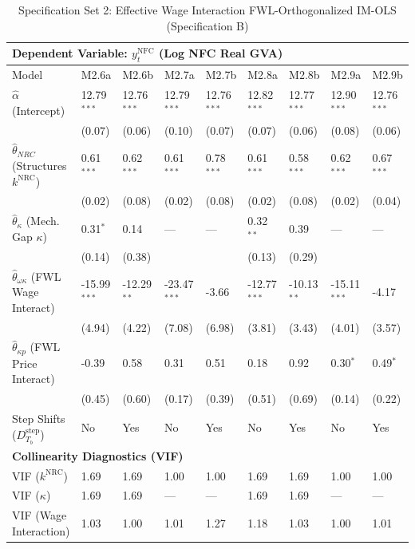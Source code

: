 \begin{table}[H]
\centering
\setlength{\tabcolsep}{2.5pt}
\caption{Specification Set 2: Effective Wage Interaction FWL-Orthogonalized IM-OLS (Specification B)}
\label{tab:specB_set2}
\scriptsize
\begin{tabular}{p{3.8cm}p{1.1cm}p{1.1cm}p{1.1cm}p{1.1cm}p{1.1cm}p{1.1cm}p{1.1cm}p{1.1cm}}
\toprule
\multicolumn{9}{l}{\textbf{Dependent Variable: $y_t^{\text{NFC}}$ (Log NFC Real GVA)}} \\
\midrule
Model & M2.6a & M2.6b & M2.7a & M2.7b & M2.8a & M2.8b & M2.9a & M2.9b \\
\midrule
$\hat{\alpha}$ (Intercept) & 12.79$^{***}$ & 12.76$^{***}$ & 12.79$^{***}$ & 12.76$^{***}$ & 12.82$^{***}$ & 12.77$^{***}$ & 12.90$^{***}$ & 12.76$^{***}$ \\
 & (0.07) & (0.06) & (0.10) & (0.07) & (0.07) & (0.06) & (0.08) & (0.06) \\
$\hat{\theta}_{NRC}$ (Structures $k^{\text{NRC}}$) & 0.61$^{***}$ & 0.62$^{***}$ & 0.61$^{***}$ & 0.78$^{***}$ & 0.61$^{***}$ & 0.58$^{***}$ & 0.62$^{***}$ & 0.67$^{***}$ \\
 & (0.02) & (0.08) & (0.02) & (0.08) & (0.02) & (0.08) & (0.02) & (0.04) \\
$\hat{\theta}_{\kappa}$ (Mech. Gap $\kappa$) & 0.31$^{*}$ & 0.14 & --- & --- & 0.32$^{**}$ & 0.39 & --- & --- \\
 & (0.14) & (0.38) &  &  & (0.13) & (0.29) &  &  \\
$\hat{\theta}_{\omega\kappa}$ (FWL Wage Interact) & -15.99$^{***}$ & -12.29$^{**}$ & -23.47$^{***}$ & -3.66 & -12.77$^{***}$ & -10.13$^{**}$ & -15.11$^{***}$ & -4.17 \\
 & (4.94) & (4.22) & (7.08) & (6.98) & (3.81) & (3.43) & (4.01) & (3.57) \\
$\hat{\theta}_{\kappa p}$ (FWL Price Interact) & -0.39 & 0.58 & 0.31 & 0.51 & 0.18 & 0.92 & 0.30$^{*}$ & 0.49$^{*}$ \\
 & (0.45) & (0.60) & (0.17) & (0.39) & (0.51) & (0.69) & (0.14) & (0.22) \\
Step Shifts ($D_{T_b}^{\text{step}}$) & No & Yes & No & Yes & No & Yes & No & Yes \\
\midrule
\multicolumn{9}{l}{\textbf{Collinearity Diagnostics (VIF)}} \\
VIF ($k^{\text{NRC}}$) & 1.69 & 1.69 & 1.00 & 1.00 & 1.69 & 1.69 & 1.00 & 1.00 \\
VIF ($\kappa$) & 1.69 & 1.69 & --- & --- & 1.69 & 1.69 & --- & --- \\
VIF (Wage Interaction) & 1.03 & 1.00 & 1.01 & 1.27 & 1.18 & 1.03 & 1.00 & 1.01 \\

\end{tabular}
\end{table}
